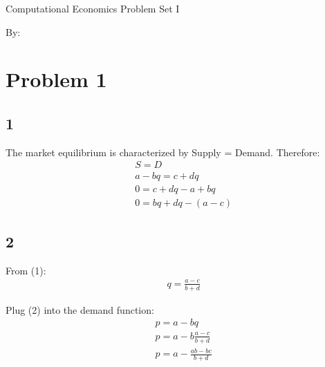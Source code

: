 \documentclass[12pt]{report}
\begin{document}
\begin{titlepage}
\begin{center}
\LARGE Computational Economics Problem Set I\\
\end{center}

\vskip 1in

\flushleft

By: \\


\vskip 1in
\begin{center}

\end{center}
\end{titlepage}

\cleardoublepage
{}

\section*{Problem 1}
\subsection*{1}
\noindent
The market equilibrium is characterized by Supply = Demand. Therefore:
\begin{equation}
\begin{aligned}
& S = D\\
& a - bq = c + dq\\
& 0 = c + dq - a + bq\\
& 0 = bq + dq - (a - c)
\end{aligned}
\end{equation}

\subsection*{2}
From (1):
\begin{equation}
\begin{aligned}
& q = \frac{a - c}{b + d}
\end{aligned}
\end{equation}

Plug (2) into the demand function:
\begin{equation}
\begin{aligned}
& p = a - bq\\
& p = a - b \frac{a - c}{b + d}\\
& p = a - \frac{ab - bc}{b + d}
\end{aligned}
\end{equation}
\end{document}
